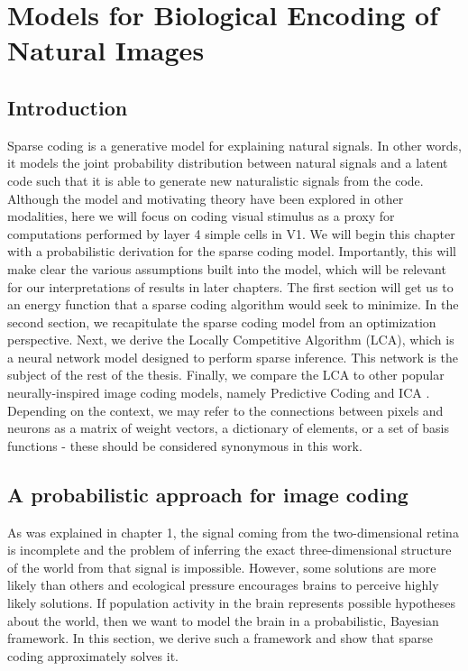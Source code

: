 \chapter{Models for Biological Encoding of Natural Images}\label{ch:lca}

\section{Introduction}
Sparse coding is a generative model for explaining natural signals. In other words, it models the joint probability distribution between natural signals and a latent code such that it is able to generate new naturalistic signals from the code. Although the model and motivating theory have been explored in other modalities, here we will focus on coding visual stimulus as a proxy for computations performed by layer 4 simple cells in V1. We will begin this chapter with a probabilistic derivation for the sparse coding model. Importantly, this will make clear the various assumptions built into the model, which will be relevant for our interpretations of results in later chapters. The first section will get us to an energy function that a sparse coding algorithm would seek to minimize. In the second section, we recapitulate the sparse coding model from an optimization perspective. Next, we derive the Locally Competitive Algorithm (LCA), which is a neural network model designed to perform sparse inference. This network is the subject of the rest of the thesis. Finally, we compare the LCA to other popular neurally-inspired image coding models, namely Predictive Coding \parencite{rao1999predictive} and ICA \parencite{bell1997independent}. Depending on the context, we may refer to the connections between pixels and neurons as a matrix of weight vectors, a dictionary of elements, or a set of basis functions - these should be considered synonymous in this work.

\section{A probabilistic approach for image coding}
As was explained in chapter 1, the signal coming from the two-dimensional retina is incomplete and the problem of inferring the exact three-dimensional structure of the world from that signal is impossible. %
However, some solutions are more likely than others and ecological pressure encourages brains to perceive highly likely solutions.
If population activity in the brain represents possible hypotheses about the world, then we want to model the brain in a probabilistic, Bayesian framework.
In this section, we derive such a framework and show that sparse coding approximately solves it.

